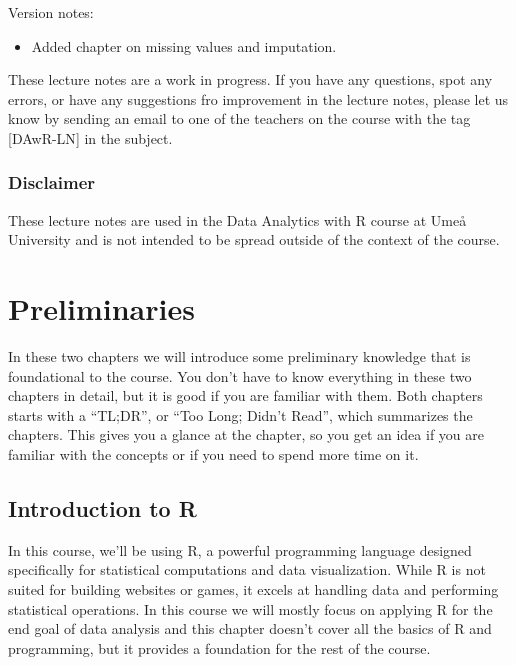 \documentclass[
  letterpaper,
  DIV=11,
  numbers=noendperiod]{scrreprt}
\providecommand{\tightlist}{%
  \setlength{\itemsep}{0pt}\setlength{\parskip}{0pt}}\usepackage{longtable,booktabs,array}
\begin{document}
Version notes:

\begin{itemize}
\tightlist
\item
  Added chapter on missing values and imputation.
\end{itemize}

These lecture notes are a work in progress. If you have any questions,
spot any errors, or have any suggestions fro improvement in the lecture
notes, please let us know by sending an email to one of the teachers on
the course with the tag {[}DAwR-LN{]} in the subject.

\section*{Disclaimer}\label{disclaimer}


These lecture notes are used in the Data Analytics with R course at Umeå
University and is not intended to be spread outside of the context of
the course.

\part{Preliminaries}

In these two chapters we will introduce some preliminary knowledge that
is foundational to the course. You don't have to know everything in
these two chapters in detail, but it is good if you are familiar with
them. Both chapters starts with a ``TL;DR'', or ``Too Long; Didn't
Read'', which summarizes the chapters. This gives you a glance at the
chapter, so you get an idea if you are familiar with the concepts or if
you need to spend more time on it.

\chapter{Introduction to R}\label{introduction-to-r}

In this course, we'll be using R, a powerful programming language
designed specifically for statistical computations and data
visualization. While R is not suited for building websites or games, it
excels at handling data and performing statistical operations. In this
course we will mostly focus on applying R for the end goal of data
analysis and this chapter doesn't cover all the basics of R and
programming, but it provides a foundation for the rest of the course.
\end{document}
